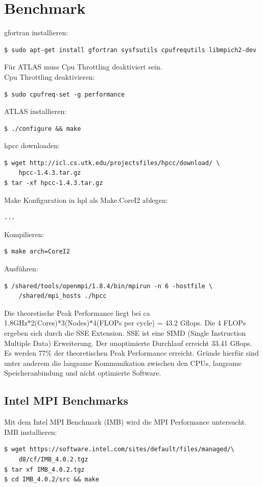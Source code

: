 \chapter{Benchmark}
gfortran installieren:
\begin{lstlisting}[style=Bash]
$ sudo apt-get install gfortran sysfsutils cpufrequtils libmpich2-dev
\end{lstlisting}
Für ATLAS muss Cpu Throttling deaktiviert sein.\\
Cpu Throttling deaktivieren: 
\begin{lstlisting}[style=Bash]
$ sudo cpufreq-set -g performance
\end{lstlisting}
ATLAS installieren:
\begin{lstlisting}[style=Bash]
$ ./configure && make
\end{lstlisting}
hpcc downloaden:
\begin{lstlisting}[style=Bash]
$ wget http://icl.cs.utk.edu/projectsfiles/hpcc/download/ \
	hpcc-1.4.3.tar.gz
$ tar -xf hpcc-1.4.3.tar.gz
\end{lstlisting}
Make Konfiguration in hpl als Make.CoreI2 ablegen:
\begin{lstlisting}[style=Bash]
...
\end{lstlisting}
Kompilieren:
\begin{lstlisting}[style=Bash]
$ make arch=CoreI2
\end{lstlisting}
Ausführen:
\begin{lstlisting}[style=Bash]
$ /shared/tools/openmpi/1.8.4/bin/mpirun -n 6 -hostfile \
	/shared/mpi_hosts ./hpcc
\end{lstlisting}
Die theoretische Peak Performance liegt bei ca 1.8GHz*2(Cores)*3(Nodes)*4(FLOPs per cycle) = 43.2 Gflops.
Die 4 FLOPs ergeben sich durch die SSE Extension. SSE ist eine SIMD (Single Instruction Multiple Data) Erweiterung.
Der unoptimierte Durchlauf erreicht 33.41 Gflops. Es werden 77\% der theoretischen Peak Performance erreicht.
Gründe hierfür sind unter anderem die langsame Kommunikation zwischen den CPUs, langsame Speicheranbindung und nicht optimierte Software.\\
\section{Intel MPI Benchmarks}
Mit dem Intel MPI Benchmark (IMB) wird die MPI Performance untersucht.\\
IMB installieren:
\begin{lstlisting}[style=Bash]
$ wget https://software.intel.com/sites/default/files/managed/\
	d8/cf/IMB_4.0.2.tgz
$ tar xf IMB_4.0.2.tgz
$ cd IMB_4.0.2/src && make
\end{lstlisting}

